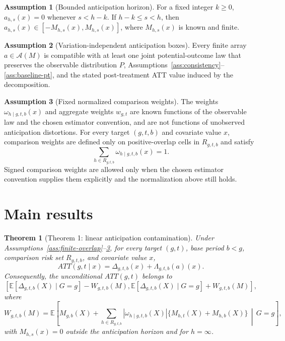 \documentclass[11pt]{article}
\newcommand{\E}{\mathbb{E}}
\theoremstyle{definition}
\newtheorem{assumption}{Assumption}
\theoremstyle{plain}
\newtheorem{theorem}{Theorem}
\theoremstyle{remark}
\begin{document}
\begin{assumption}[Bounded anticipation horizon]\label{ass:bounded-anticipation}
For a fixed integer \(k\ge0\), \(a_{h,s}(x)=0\) whenever \(s<h-k\).  If \(h-k\le s<h\), then \(a_{h,s}(x)\in[-M_{h,s}(x),M_{h,s}(x)]\), where \(M_{h,s}(x)\) is known and finite.
\end{assumption}

\begin{assumption}[Variation-independent anticipation boxes]\label{ass:box-independence}
Every finite array \(a\in\mathcal{A}(M)\) is compatible with at least one joint potential-outcome law that preserves the observable distribution \(P\), Assumptions~\ref{ass:consistency}--\ref{ass:baseline-pt}, and the stated post-treatment ATT value induced by the decomposition.
\end{assumption}

\begin{assumption}[Fixed normalized comparison weights]\label{ass:fixed-weights}
The weights \(\omega_{h\mid g,t,b}(x)\) and aggregate weights \(w_{g,t}\) are known functions of the observable law and the chosen estimator convention, and are not functions of unobserved anticipation distortions.  For every target \((g,t,b)\) and covariate value \(x\), comparison weights are defined only on positive-overlap cells in \(R_{g,t,b}\) and satisfy
\[
  \sum_{h\in R_{g,t,b}}\omega_{h\mid g,t,b}(x)=1.
\]
Signed comparison weights are allowed only when the chosen estimator convention supplies them explicitly and the normalization above still holds.
\end{assumption}

\section{Main results}
\begin{theorem}[Theorem 1: linear anticipation contamination]\label{thm:linear-contamination}
Under Assumptions~\ref{ass:finite-overlap}--\ref{ass:fixed-weights}, for every target \((g,t)\), base period \(b<g\), comparison risk set \(R_{g,t,b}\), and covariate value \(x\),
\[
  ATT(g,t\mid x)
  =
  \Delta_{g,t,b}(x)+\Lambda_{g,t,b}(a)(x).
\]
Consequently, the unconditional \(ATT(g,t)\) belongs to
\[
  \left[
  \E[\Delta_{g,t,b}(X)\mid G=g] - W_{g,t,b}(M),
  \E[\Delta_{g,t,b}(X)\mid G=g] + W_{g,t,b}(M)
  \right],
\]
where
\[
  W_{g,t,b}(M)=
  \E\!\left[
    M_{g,b}(X)+
    \sum_{h\in R_{g,t,b}}|\omega_{h\mid g,t,b}(X)|
      \{M_{h,t}(X)+M_{h,b}(X)\}
    \,\middle|\,G=g
  \right],
\]
with \(M_{h,s}(x)=0\) outside the anticipation horizon and for \(h=\infty\).
\end{theorem}
\end{document}
